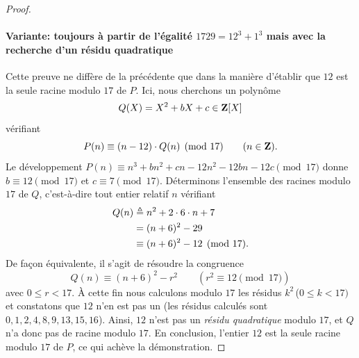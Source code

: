 \begin{proof}
\paragraph{Variante: toujours à partir de l'égalité $1729 = 12^3 + 1^3$ mais avec la recherche d'un résidu quadratique} %
Cette preuve ne diffère de la précédente que dans la manière d'établir que $12$ est la seule racine modulo $17$ de $P$. Ici, %
nous cherchons un polynôme 
%
\begin{equation}
  Q(X)=X^2+ b X+ c \in \mathbf{Z}[X]
\end{equation}
%
vérifiant
%
\begin{equation}
  P(n) \equiv  (n-12)\cdot Q(n) \pmod{17} \qquad (n \in \mathbf{Z}).
\end{equation}
%
Le développement $P(n) \equiv  n^3 + b n^2 + c n - 12 n^2 - 12 bn - 12 c \pmod{17}$ donne %
$b\equiv 12 \pmod{17}$ et $c \equiv 7 \pmod{17}$. Déterminons l'ensemble des racines modulo $17$ de $Q$, c'est-à-dire tout %
entier relatif $n$ vérifiant%
%
\begin{align}
  Q(n) &\triangleq  n^2 + 2\cdot 6 \cdot n + 7 \\
  &= (n + 6)^2 - 29 \\
  &\equiv (n + 6)^2 - 12 \pmod{17}.
\end{align}
%
De façon équivalente, il s'agit de résoudre la congruence
%
\begin{equation}
  Q(n) \equiv (n + 6)^2 - r^2 \qquad (r^2 \equiv 12 \pmod{17})
\end{equation}
%
avec $0\leq r < 17$. À cette fin nous calculons modulo $17$ les résidus $k^2$\;\,($0 \leq k < 17)$ et constatons que $12$ %
n'en est pas un (les résidus calculés sont $0, 1, 2, 4, 8, 9, 13, 15, 16$). Ainsi, $12$ n'est pas un \emph{résidu quadratique} 
modulo $17$, et $Q$ n'a donc pas de racine modulo $17$. En conclusion, l'entier $12$ est la seule racine modulo $17$ de $P$, %
ce qui achève la démonstration.
\end{proof}